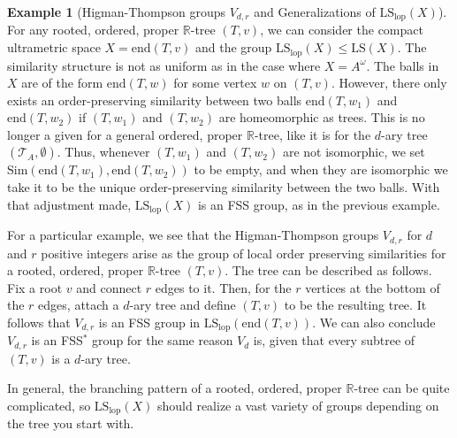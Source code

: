 \documentclass[12pt]{amsart}
\numberwithin{equation}{subsection}
\theoremstyle{definition}
\theoremstyle{definition}
\newtheorem{example}[theorem]{Example}
\theoremstyle{remark}
\begin{document}
\begin{example}[Higman-Thompson groups $V_{d,r}$ and Generalizations of $\text{LS}_{\text{lop}}(X)$]\label{ex:Vdr} 
For any rooted, ordered, proper $\mathbb R$-tree $(T,v)$, we can consider the compact ultrametric space $X = \text{end}(T,v)$ and the group $\text{LS}_{\text{lop}}(X) \leq \text{LS}(X)$. The similarity structure is not as uniform as in the case where $X=A^\omega$. The balls in $X$ are of the form $\text{end}(T, w)$ for some vertex $w$ on $(T,v)$. However, there only exists an order-preserving similarity between two balls $\text{end}(T, w_1)$ and $\text{end}(T, w_2)$ if $(T, w_1)$ and $(T, w_2)$ are homeomorphic as trees. This is no longer a given for a general ordered, proper $\mathbb R$-tree, like it is for the $d$-ary tree $(\mathcal T_A, \emptyset)$. Thus, whenever $(T, w_1)$ and $(T, w_2)$ are not isomorphic, we set $\text{Sim}(\text{end}(T, w_1),\text{end}(T, w_2))$ to be empty, and when they are isomorphic we take it to be the unique order-preserving similarity between the two balls. With that adjustment made, $\text{LS}_{\text{lop}}(X)$ is an FSS group, as in the previous example. 

For a particular example, we see that the Higman-Thompson groups $V_{d,r}$ for $d$ and $r$ positive integers arise as the group of local order preserving similarities for a rooted, ordered, proper $\mathbb R$-tree $(T,v)$. The tree can be described as follows. Fix a root $v$ and connect $r$ edges to it. Then, for the $r$ vertices at the bottom of the $r$ edges, attach a $d$-ary tree and define $(T,v)$ to be the resulting tree. It follows that $V_{d,r}$ is an FSS group in  $\text{LS}_{\text{lop}}(\text{end}(T,v))$. We can also conclude $V_{d,r}$ is an FSS$^*$ group for the same reason $V_d$ is, given that every subtree of $(T,v)$ is a $d$-ary tree. 

In general, the branching pattern of a rooted, ordered, proper $\mathbb R$-tree can be quite complicated, so $\text{LS}_{\text{lop}}(X)$ should realize a vast variety of groups depending on the tree you start with. 
    
\end{example}
\end{document}
